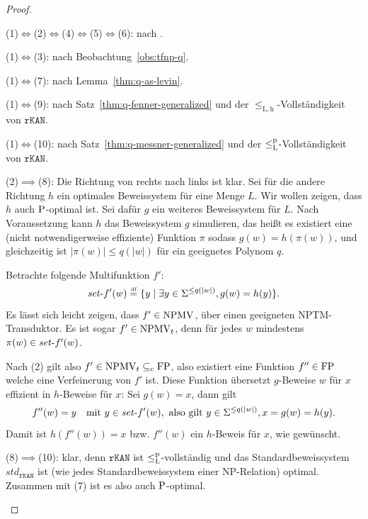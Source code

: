 \begin{proof}
\begin{prooflist}[label={\arabic*.},labelsep=3pt]
\item (1)$\iff$(2)$\iff$(4)$\iff$(5)$\iff$(6): nach \textcite[Thm.~2]{fenner_inverting_2003}. 

\item (1)$\iff$(3): nach Beobachtung~\ref{obs:tfnp-q}.

\item (1)$\iff$(7): nach Lemma~\ref{thm:q-as-levin}.

\item (1)$\iff$(9): nach Satz~\ref{thm:q-fenner-generalized} und der $\leq_\mathrm{L,h}$-Vollständigkeit von $\mathtt{rKAN}$.

\item (1)$\iff$(10): nach Satz~\ref{thm:q-messner-generalized} und der $\leqlp$-Vollständigkeit von $\mathtt{rKAN}$.

\item (2)$\implies$(8): Die Richtung von rechts nach links ist klar. Sei für die andere Richtung $h$ ein optimales Beweissystem für eine Menge $L$. Wir wollen zeigen, dass $h$ auch $\P$-optimal ist. Sei dafür $g$ ein weiteres Beweissystem für $L$. Nach Voraussetzung kann $h$ das Beweissystem $g$ simulieren, das heißt es existiert eine (nicht notwendigerweise effiziente) Funktion $\pi$ sodass $g(w)=h(\pi(w))$, und gleichzeitig ist $|\pi(w)|\leq q(|w|)$ für ein geeignetes Polynom $q$.

Betrachte folgende Multifunktion $f'$:
\[ \fset{}f'(w) \defeq  \{ y \mid \exists y\in\Sigma^{\leq q(|w|)}, g(w)=h(y) \}. \]
Es lässt sich leicht zeigen, dass $f'\in\NPMV$, über einen geeigneten NPTM-Transduktor. 
Es ist sogar $f'\in\NPMV_t$, denn für jedes $w$ mindestens $\pi(w)\in \fset{}f'(w)$.

Nach (2) gilt also $f'\in\NPMV_t\subseteqc \FP$, also existiert eine Funktion $f''\in\FP$ welche eine Verfeinerung von $f'$ ist. Diese Funktion übersetzt $g$-Beweise $w$ für $x$ effizient in $h$-Beweise für $x$: 
Sei $g(w)=x$, dann gilt
\[ f''(w) = y \quad\text{mit } y\in\fset{}f'(w), \text{ also gilt } y\in\Sigma^{\leq q(|w|)}, x=g(w)=h(y). \]
Damit ist $h(f''(w))=x$ bzw. $f''(w)$ ein $h$-Beweis für $x$, wie gewünscht.


\item (8)$\implies$(10): klar, denn $\mathtt{rKAN}$ ist $\leqlp$-vollständig und das Standardbeweissystem $\mathit{std}_\mathtt{rKAN}$ ist (wie jedes Standardbeweissystem einer NP-Relation) optimal. Zusammen mit (7) ist es also auch $\P$-optimal.
\end{prooflist}
\end{proof}

